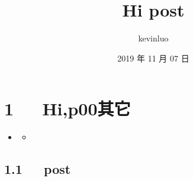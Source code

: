 \documentclass[letterpaper,12pt,english]{sphinxmanual}
\title{Hi post}
\date{2019 年 11 月 07 日}
\author{kevinluo}
\begin{document}
\pagestyle{empty}
\sphinxmaketitle
\pagestyle{plain}
\sphinxtableofcontents
\pagestyle{normal}
\label{\detokenize{index::doc}}



\chapter{1   Hi,p00其它}
\label{\detokenize{p00_u5176_u5b83/Hello_uff0cp00_u5176_u5b83:hi-p00}}\label{\detokenize{p00_u5176_u5b83/Hello_uff0cp00_u5176_u5b83::doc}}
\begin{sphinxShadowBox}
\begin{itemize}
\item {} 
\label{\detokenize{p00_u5176_u5b83/Hello_uff0cp00_u5176_u5b83:id2}}{\hyperref[\detokenize{p00_u5176_u5b83/Hello_uff0cp00_u5176_u5b83:hi-p00}]{}}
\begin{itemize}
\item {} 
\label{\detokenize{p00_u5176_u5b83/Hello_uff0cp00_u5176_u5b83:id3}}{\hyperref[\detokenize{p00_u5176_u5b83/Hello_uff0cp00_u5176_u5b83:post}]{}}

\end{itemize}

\end{itemize}
\end{sphinxShadowBox}


\section{1.1   post}
\label{\detokenize{p00_u5176_u5b83/Hello_uff0cp00_u5176_u5b83:post}}
\end{document}
